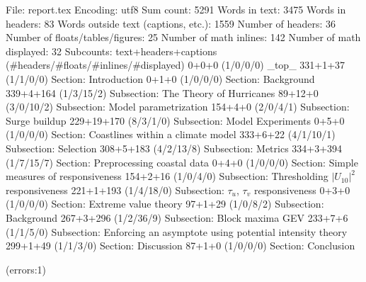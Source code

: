 
File: report.tex
Encoding: utf8
Sum count: 5291
Words in text: 3475
Words in headers: 83
Words outside text (captions, etc.): 1559
Number of headers: 36
Number of floats/tables/figures: 25
Number of math inlines: 142
Number of math displayed: 32
Subcounts:
  text+headers+captions (#headers/#floats/#inlines/#displayed)
  0+0+0 (1/0/0/0) _top_
  331+1+37 (1/1/0/0) Section: Introduction
  0+1+0 (1/0/0/0) Section: Background
  339+4+164 (1/3/15/2) Subsection: The Theory of Hurricanes
  89+12+0 (3/0/10/2) Subsection: Model parametrization
  154+4+0 (2/0/4/1) Subsection: Surge buildup
  229+19+170 (8/3/1/0) Subsection: Model Experiments
  0+5+0 (1/0/0/0) Section: Coastlines within a climate model
  333+6+22 (4/1/10/1) Subsection: Selection
  308+5+183 (4/2/13/8) Subsection: Metrics
  334+3+394 (1/7/15/7) Section: Preprocessing coastal data
  0+4+0 (1/0/0/0) Section: Simple measures of responsiveness
  154+2+16 (1/0/4/0) Subsection: Thresholding $|U_{10}|^2$ responsiveness
  221+1+193 (1/4/18/0) Subsection: $\tau_u$, $\tau_v$ responsiveness
  0+3+0 (1/0/0/0) Section: Extreme value theory
  97+1+29 (1/0/8/2) Subsection: Background
  267+3+296 (1/2/36/9) Subsection: Block maxima GEV
  233+7+6 (1/1/5/0) Subsection: Enforcing an asymptote using potential intensity theory 
  299+1+49 (1/1/3/0) Section: Discussion
  87+1+0 (1/0/0/0) Section: Conclusion

(errors:1)
